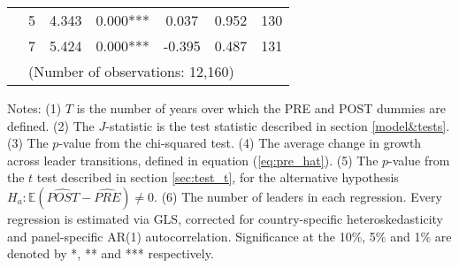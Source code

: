 \begin{table}[h]
{\begin{threeparttable}
\begin{tabular}{ccccccc}
	& 5   & 4.343                                                    & 0.000***                                                 & 0.037                          & 0.952                                                            & 130                                                         \\
	& 7   & 5.424                                                    & 0.000***                                                 & -0.395                         & 0.487                                                            & 131                                                         \\
	& \multicolumn{6}{l}{\footnotesize{(Number of observations: 12,160)}}                                                                                                                                                                                                                                                                        \\ \hline \hline
\end{tabular}


\begin{tablenotes}
	\footnotesize{Notes: (1) $T$ is the number of years over which the PRE and POST dummies are defined. (2) The $J$-statistic is the test statistic described in section \ref{model&tests}. (3) The $p$-value from the chi-squared test. (4) The average change in growth across leader transitions, defined in equation (\ref{eq:pre_hat}). (5) The $p$-value from the $t$ test described in section \ref{sec:test_t}, for the alternative hypothesis $H_a: \mathds{E}(\widehat{POST}-\widehat{PRE} )\neq0$. (6) The number of leaders in each regression. Every regression is estimated via GLS, corrected for country-specific heteroskedasticity and panel-specific AR(1) autocorrelation. Significance at the 10\%, 5\% and 1\% are denoted by *, **  and *** respectively.}
\end{tablenotes}
\end{threeparttable}
}
\end{table}	